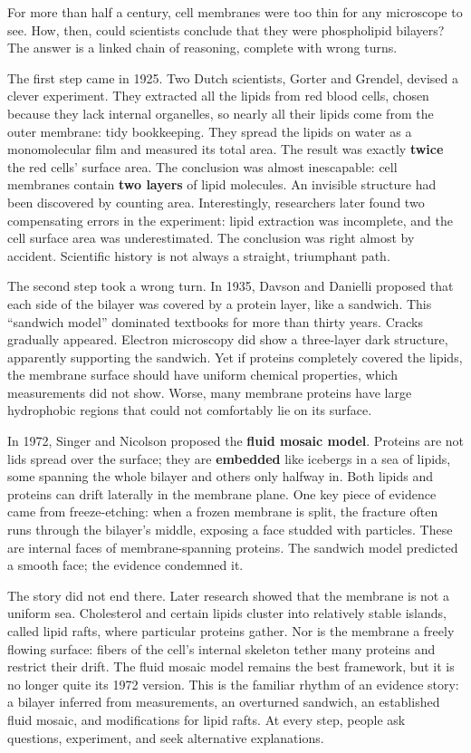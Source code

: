 \begin{zhengju}
For more than half a century, cell membranes were too thin for any microscope to see. How, then, could scientists conclude that they were phospholipid bilayers? The answer is a linked chain of reasoning, complete with wrong turns.

The first step came in 1925. Two Dutch scientists, Gorter and Grendel, devised a clever experiment. They extracted all the lipids from red blood cells, chosen because they lack internal organelles, so nearly all their lipids come from the outer membrane: tidy bookkeeping. They spread the lipids on water as a monomolecular film and measured its total area. The result was exactly \textbf{twice} the red cells' surface area. The conclusion was almost inescapable: cell membranes contain \textbf{two layers} of lipid molecules. An invisible structure had been discovered by counting area. Interestingly, researchers later found two compensating errors in the experiment: lipid extraction was incomplete, and the cell surface area was underestimated. The conclusion was right almost by accident. Scientific history is not always a straight, triumphant path.

The second step took a wrong turn. In 1935, Davson and Danielli proposed that each side of the bilayer was covered by a protein layer, like a sandwich. This ``sandwich model'' dominated textbooks for more than thirty years. Cracks gradually appeared. Electron microscopy did show a three-layer dark structure, apparently supporting the sandwich. Yet if proteins completely covered the lipids, the membrane surface should have uniform chemical properties, which measurements did not show. Worse, many membrane proteins have large hydrophobic regions that could not comfortably lie on its surface.

In 1972, Singer and Nicolson proposed the \textbf{fluid mosaic model}. Proteins are not lids spread over the surface; they are \textbf{embedded} like icebergs in a sea of lipids, some spanning the whole bilayer and others only halfway in. Both lipids and proteins can drift laterally in the membrane plane. One key piece of evidence came from freeze-etching: when a frozen membrane is split, the fracture often runs through the bilayer's middle, exposing a face studded with particles. These are internal faces of membrane-spanning proteins. The sandwich model predicted a smooth face; the evidence condemned it.

The story did not end there. Later research showed that the membrane is not a uniform sea. Cholesterol and certain lipids cluster into relatively stable islands, called lipid rafts, where particular proteins gather. Nor is the membrane a freely flowing surface: fibers of the cell's internal skeleton tether many proteins and restrict their drift. The fluid mosaic model remains the best framework, but it is no longer quite its 1972 version. This is the familiar rhythm of an evidence story: a bilayer inferred from measurements, an overturned sandwich, an established fluid mosaic, and modifications for lipid rafts. At every step, people ask questions, experiment, and seek alternative explanations.
\end{zhengju}

